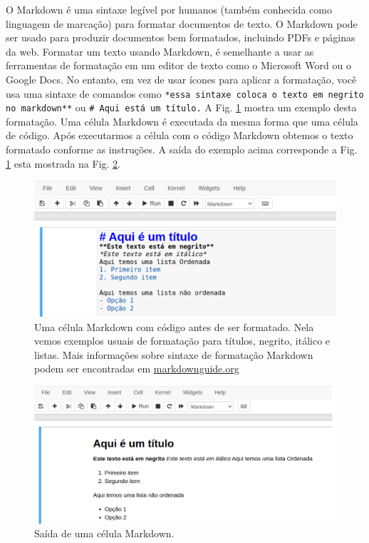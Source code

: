 O Markdown é uma sintaxe legível por humanos (também conhecida como linguagem de marcação) para formatar documentos de texto. O Markdown pode ser usado para produzir documentos bem formatados, incluindo PDFs e páginas da web. Formatar um texto usando Markdown, é semelhante a usar as ferramentas de formatação em um editor de texto como o Microsoft Word ou o Google Docs. No entanto, em vez de usar ícones para aplicar a formatação, você usa uma sintaxe de comandos como {\tt **essa sintaxe coloca o texto em negrito no markdown**} ou {\tt \# Aqui está um título.} A Fig. \ref{fig:JN-Markdown-Raw} mostra um exemplo desta formatação. Uma célula Markdown é executada da mesma forma que uma célula de código. Após executarmos a célula com o código Markdown obtemos o texto formatado conforme as instruções. A saída do exemplo acima corresponde a Fig.
\ref{fig:JN-Markdown-Raw} esta mostrada na Fig. \ref{fig:JN-Markdown-prod}.
\begin{figure}[ht]
\centering
\includegraphics[scale=0.4]{Images/markdown-raw.png}
\caption{Uma célula Markdown com código antes de ser formatado. Nela vemos exemplos usuais de formatação para títulos, negrito, itálico e listas. Mais informações sobre sintaxe de formatação Markdown podem ser encontradas em \href{https://www.markdownguide.org/}{markdownguide.org}} \label{fig:JN-Markdown-Raw}
\end{figure}
\begin{figure}[h!]
\centering
\includegraphics[scale=0.4]{Images/markdown-prod.png}
\caption{Saída de uma célula Markdown.} \label{fig:JN-Markdown-prod}
\end{figure}


